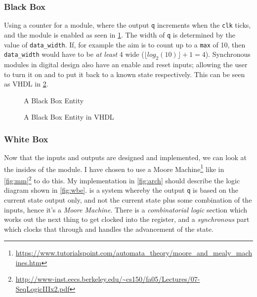 \subsubsection{Black Box}
Using a counter for a module, where the output \texttt{q} increments when the \texttt{clk} ticks, and the module is enabled as seen in \cref{fig:bbe}. The width of \texttt{q} is determined by the value of \texttt{data\_width}. If, for example the aim is to count up to  a \texttt{max} of 10, then \texttt{data\_width} would have to be \emph{at least} 4 wide ($\lfloor log_2(10)\rfloor + 1 = 4$). Synchronous modules in digital design also have an enable and reset inputs; allowing the user to turn it on and to put it back to a known state respectively. This can be seen as VHDL in \cref{fig:bbe_vhdl}.

\begin{figure}[H]
    \begin{center}
       
    \end{center}
    \caption{A Black Box Entity}
    \label{fig:bbe}
\end{figure}

\begin{figure}[H]
    \begin{center}
    	
    \end{center}
    \caption{A Black Box Entity in VHDL}
    \label{fig:bbe_vhdl}
\end{figure}

\subsubsection{White Box}
Now that the inputs and outputs are designed and implemented, we can look at the insides of the module. I have chosen to use a Moore Machine\footnote{\url{https://www.tutorialspoint.com/automata_theory/moore_and_mealy_machines.htm}} like in \cref{fig:mm}\footnote{\url{http://www-inst.eecs.berkeley.edu/~cs150/fa05/Lectures/07-SeqLogicIIIx2.pdf}} to do this. My implementation in \cref{fig:arch} should describe the logic diagram shown in \cref{fig:wbe}.  is a system whereby the output \texttt{q} is based on the current state output only, and not the current state plus some combination of the inputs, hence it's a \emph{Moore Machine}. There is a \emph{combinatorial logic} section which works out the next thing to get clocked into the register, and a \emph{synchronous} part which clocks that through and handles the advancement of the state.

